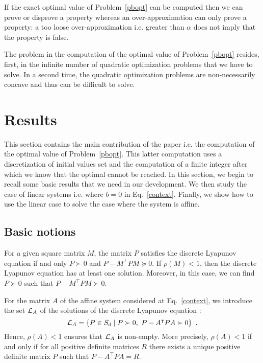 \documentclass[10pt]{article}
\begin{document}
If the exact optimal value of Problem~\eqref{pbopt} can be computed then we can prove or disprove a property whereas an over-approximation can only prove a property: a too loose over-approximation i.e. greater than $\alpha$ does not imply that the property is false. 

The problem in the computation of the optimal value of Problem~\eqref{pbopt} resides, first, in the infinite number of quadratic optimization problems that we have to solve. In a second time, the quadratic optimization problems are non-necessarily concave and thus can be difficult to solve. 
\section{Results}
\label{mainresults}
This section contains the main contribution of the paper i.e. the computation of the optimal value of Problem~\eqref{pbopt}. This latter computation uses a discretization of initial values set and the computation of a finite integer after which we know that the optimal cannot be reached. In this section, we begin to recall some basic results that we need in our development. We then study the case of linear systems i.e. where $b=0$ in Eq.~\eqref{context}. Finally, we show how to use the linear case to solve the case where the system is affine.   
\subsection{Basic notions}

For a given square matrix $M$, the matrix $P$ satisfies the discrete Lyapunov equation if and only $P\succ 0$ and $P-M^\intercal P M\succeq 0$. If $\rho(M)<1$, then the discrete Lyapunov equation has at least one solution. Moreover, in this case, we can find $P\succ 0$ such that $P-M^\intercal P M\succ 0$.  

For the matrix $A$ of the affine system considered at Eq.~\eqref{context}, we introduce the set $\mathcal{L}_{A}$ of the  solutions  of the discrete Lyapunov equation :
\[
\mathcal{L}_{A}=\{P\in S_d \mid P\succ 0,\ P-A^\intercal P A\succ 0\}\enspace .
\]
Hence, $\rho(A)<1$ ensures that $\mathcal{L}_{A}$ is non-empty. More precisely, $\rho(A)<1$ if and only if for all positive definite matrices $R$ there exists a unique positive definite matrix $P$ such that $P-A^\intercal P A=R$.
\end{document}
